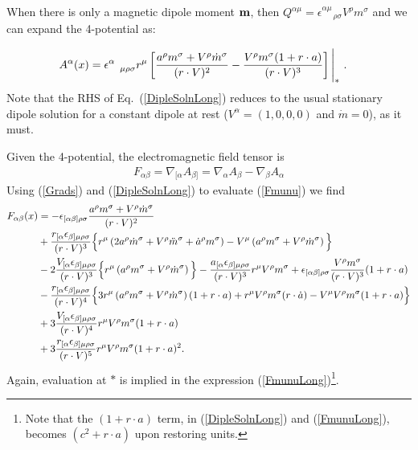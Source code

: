 When there is only a magnetic dipole moment ${\bf m}$, then $Q^{\alpha \mu}=\epsilon^{\alpha \mu}_{\quad \ \ \rho \sigma}V^\rho m^\sigma$ and we can
expand the 4-potential as:
\begin{widetext}
\begin{align}
A^\alpha (x) &= \epsilon^{\alpha}_{\quad \mu \rho \sigma} r^\mu \left [\frac{a^\rho
  m^\sigma  + V^\rho \dot  m^\sigma }{(r\cdot V)^2} 
 -\frac{V^\rho m^\sigma (1+r\cdot a)}{(r\cdot V)^3}\right ]\Bigg{|}_{*}   \ .
\label{DipleSolnLong}
\end{align}
Note that the RHS of Eq.\ (\ref{DipleSolnLong})
reduces to the usual stationary dipole solution for a constant dipole at rest ($V^{\alpha}=(1,0,0,0)$ and $\dot m=0$), as it must.

Given the 4-potential, the electromagnetic field tensor is
\begin{align}
F_{\alpha \beta} = \nabla_{[\alpha} A_{\beta]} = \nabla_{\alpha} A_{\beta} - \nabla_{\beta} A_{\alpha}
\label{Fmunu}
\end{align}
Using (\ref{Grads}) and (\ref{DipleSolnLong}) to evaluate (\ref{Fmunu}) we find
\begin{align}
F_{\alpha \beta} (x) &= - \epsilon_{  [\alpha \beta]  \rho \sigma} \frac{ a^\rho m^\sigma  + V^{\rho} \dot{m}^{\sigma}  }{(r \cdot V)^2} \nonumber \\
&+     \frac{r_{[\alpha} \epsilon_{ \beta] \mu  \rho \sigma}}{(r \cdot V)^3} \Big{\{} r^{\mu} \left( 2a^{\rho} \dot{m}^{\sigma} + V^{\rho} \ddot{m}^{\sigma} + \dot{a}^{\rho} m^{\sigma}   \right)   -  V^{\mu} \left( a^{\rho} m^{\sigma} + V^{\rho} \dot{m}^{\sigma} \right) \Big{\}}
\nonumber \\
&- 2   \frac{ V_{[\alpha} \epsilon_{ \beta] \mu \rho \sigma}}{(r \cdot V)^3} \Big{\{}r^{\mu} \left( a^{\rho} m^{\sigma} + V^{\rho} \dot{m}^{\sigma} \right)  \Big{\}}  
 -  \frac{ a_{[\alpha} \epsilon_{\beta] \mu \rho \sigma}  }{(r \cdot V)^3} r^{\mu} V^{\rho} m^{\sigma} 
+   \epsilon_{ [\alpha \beta]  \rho \sigma} \frac{ V^\rho m^\sigma}{(r \cdot V)^3} (1+ r \cdot a) 
\nonumber \\
&-    \frac{r_{[\alpha} \epsilon_{\beta] \mu \rho \sigma}}{(r \cdot V)^4} \Big{\{} 3 r^{\mu} \left( a^{\rho} m^{\sigma} +  V^{\rho} \dot{m}^{\sigma}   \right) (1+ r \cdot a) + r^{\mu} V^{\rho} m^{\sigma}   (r \cdot \dot{a}) -  V^{\mu} V^{\rho} m^{\sigma}  (1+ r \cdot a) \Big{\}}
\nonumber \\
&+ 3     \frac{ V_{[\alpha} \epsilon_{\beta] \mu \rho \sigma}}{(r \cdot V)^4}  r^{\mu} V^{\rho} m^{\sigma} (1+ r \cdot a)
\nonumber \\
&+ 3   \frac{ r_{[\alpha} \epsilon_{\beta] \mu \rho \sigma}}{(r \cdot V)^5}  r^{\mu} V^{\rho} m^{\sigma} (1+ r \cdot a)^2.
\label{FmunuLong}
\end{align}
Again, evaluation at $*$ is implied in the expression (\ref{FmunuLong})\footnote{Note that the $(1 + r \cdot a)$ term, in (\ref{DipleSolnLong}) and  (\ref{FmunuLong}), becomes $(c^2 + r \cdot a)$ upon restoring units.}.



\end{widetext}
